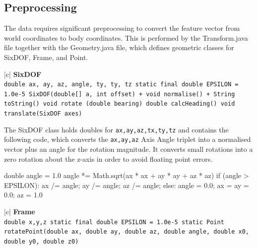 \documentclass[12pt,a4,notitlepage]{report}
\renewcommand{\_}{\texttt{\symbol{95}}}
\newcommand{\<}{\texttt{\symbol{60}}}
\renewcommand{\>}{\texttt{\symbol{62}}}
\newcommand{\class}[1]{\textbf{#1}}
\newcommand{\variable}[1]{\texttt{#1}}
\begin{document}
{\subsection{Preprocessing}

The data requires significant preprocessing to convert the feature vector from world coordinates to body coordinates. This is performed by the Transform.java file together with the Geometry.java file, which defines geometric classes for SixDOF, Frame, and Point.

\begin{tabular}{|c|} \hline 
\class{SixDOF} \\ \hline
{}
{\variable{double ax, ay, az, angle, ty, ty, tz \newline
  static final double EPSILON = 1.0e-5 \newline
  SixDOF(double[] a, int offset) \newline
  + void normalise() \newline
  + String toString() \newline
  void rotate (double bearing) \newline
  double calcHeading() \newline
  void translate(SixDOF axes)
} } \\ \hline
\end{tabular}

The SixDOF class holds doubles for \variable{ax,ay,az,tx,ty,tz} and contains the following code, which converts the \variable{ax,ay,az} Axis Angle triplet into a normalised vector plus an angle for the rotation magnitude. It converts small rotations into a zero rotation about the z-axis in order to avoid floating point errors.

\begin{code}
double angle = 1.0
angle *= Math.sqrt(ax * ax + ay * ay + az * az)
if (angle > EPSILON):
    ax /= angle;
    ay /= angle;
    az /= angle;
else:
    angle = 0.0;
    ax = ay = 0.0;
    az = 1.0
\end{code}

\begin{tabular}{|c|} \hline 
\class{Frame} \\ \hline
{}
{\variable{double x,y,z \newline
  static final double EPSILON = 1.0e-5 \newline
  static Point rotatePoint(double ax, double ay, double az, double angle, double x0, double y0, double z0)
} } \\ \hline
\end{tabular}

}
\end{document}
